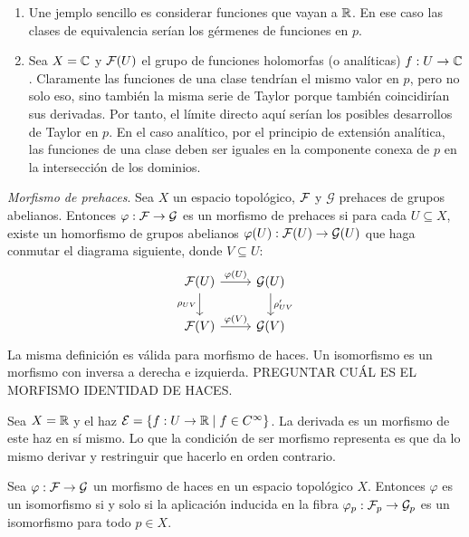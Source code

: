 \documentclass[GA.tex]{subfiles}
\begin{document}
\begin{ejs}
\begin{enumerate}
\item Une jemplo sencillo es considerar funciones que vayan a $\mathbb{R}$. En ese caso las clases de equivalencia serían los gérmenes de funciones en $p$. 

\item Sea $X=\mathbb{C}$ y $\mathcal{F}(U)$ el grupo de funciones holomorfas (o analíticas) $f:U\to\mathbb{C}$. Claramente las funciones de una clase tendrían el mismo valor en $p$, pero no solo eso, sino también la misma serie de Taylor porque también coincidirían sus derivadas. Por tanto, el límite directo aquí serían los posibles desarrollos de Taylor en $p$. En el caso analítico, por el principio de extensión analítica, las funciones de una clase deben ser iguales en la componente conexa de $p$ en la intersección de los dominios. 
\end{enumerate}
\end{ejs}


\begin{defi}
\emph{Morfismo de prehaces}. Sea $X$ un espacio topológico, $\mathcal{F}$ y $\mathcal{G}$ prehaces de grupos abelianos. Entonces $\varphi:\mathcal{F}\to\mathcal{G}$ es un morfismo de prehaces si para cada $U\subseteq X$, existe un homorfismo de grupos abelianos $\varphi(U):\mathcal{F}(U)\to\mathcal{G}(U)$ que haga conmutar el diagrama siguiente, donde $V\subseteq U$:
\[
\begin{tikzcd}
\calF(U)\arrow[r, "\varphi(U)"]\arrow[d, "\rho_{UV}"'] & \calG(U)\arrow[d, "\rho'_{UV}"]\\
\calF(V)\arrow[r, "\varphi(V)"] & \calG(V)
\end{tikzcd}
\]
La misma definición es válida para morfismo de haces. Un isomorfismo es un morfismo con inversa a derecha e izquierda. PREGUNTAR CUÁL ES EL MORFISMO IDENTIDAD DE HACES.
\end{defi}

\begin{ej}
Sea $X=\mathbb{R}$ y el haz $\mathcal{E}=\{f:U\to \mathbb{R}\mid f\in C^{\infty}\}$. La derivada es un morfismo de este haz en sí mismo. Lo que la condición de ser morfismo representa es que da lo mismo derivar y restringuir que hacerlo en orden contrario.
\end{ej}


\begin{prop}
Sea $\varphi:\mathcal{F}\to\mathcal{G}$ un morfismo de haces en un espacio topológico $X$. Entonces $\varphi$ es un isomorfismo si y solo si la aplicación inducida en la fibra $\varphi_p:\mathcal{F}_p\to\mathcal{G}_p$ es un isomorfismo para todo $p\in X$.
\end{prop}
\end{document}
